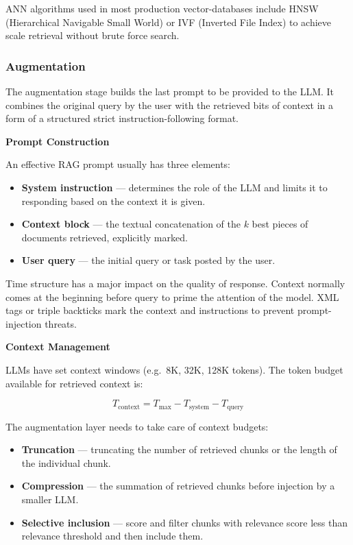 ANN algorithms used in most production vector-databases include HNSW (Hierarchical Navigable Small World) or IVF (Inverted File Index) to achieve scale retrieval without brute force search.

\subsubsection{Augmentation}

The augmentation stage builds the last prompt to be provided to the LLM. It combines the original query by the user with the retrieved bits of context in a form of a structured strict instruction-following format.

\textbf{Prompt Construction}

An effective RAG prompt usually has three elements:
\begin{itemize}
    \item \textbf{System instruction} — determines the role of the LLM and limits it to responding based on the context it is given.
    \item \textbf{Context block} — the textual concatenation of the $k$ best pieces of documents retrieved, explicitly marked.
    \item \textbf{User query} — the initial query or task posted by the user.
\end{itemize}

Time structure has a major impact on the quality of response. Context normally comes at the beginning before query to prime the attention of the model. XML tags or triple backticks mark the context and instructions to prevent prompt-injection threats.

\textbf{Context Management}

LLMs have set context windows (e.g.\ 8K, 32K, 128K tokens). The token budget available for retrieved context is:

\begin{equation}
    T_{\text{context}} = T_{\max} - T_{\text{system}} - T_{\text{query}}
\end{equation}

The augmentation layer needs to take care of context budgets:
\begin{itemize}
    \item \textbf{Truncation} — truncating the number of retrieved chunks or the length of the individual chunk.
    \item \textbf{Compression} — the summation of retrieved chunks before injection by a smaller LLM.
    \item \textbf{Selective inclusion} — score and filter chunks with relevance score less than relevance threshold and then include them.
\end{itemize}

